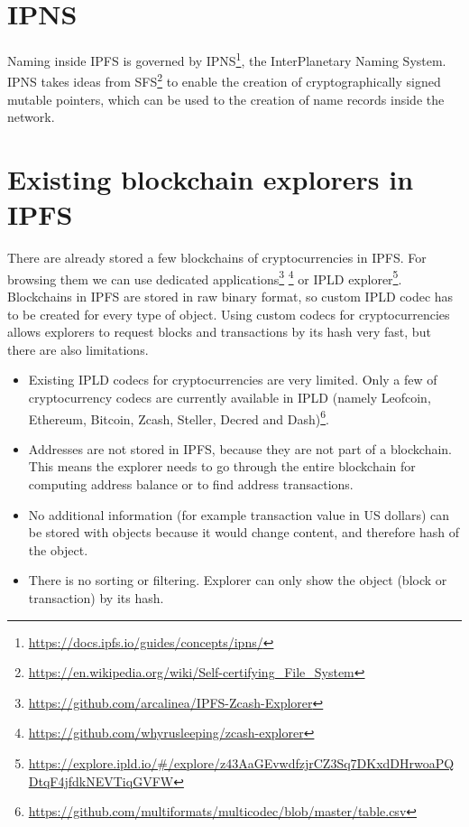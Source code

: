 \section{IPNS}
Naming inside IPFS is governed by IPNS\footnote{\url{https://docs.ipfs.io/guides/concepts/ipns/}}, the InterPlanetary Naming System. IPNS takes ideas from SFS\footnote{\url{https://en.wikipedia.org/wiki/Self-certifying_File_System}} to enable the creation of cryptographically signed mutable pointers, which can be used to the creation of name records inside the network.

\section{Existing blockchain explorers in IPFS}
There are already stored a few blockchains of cryptocurrencies in IPFS. For browsing them we can use dedicated applications\footnote{\url{https://github.com/arcalinea/IPFS-Zcash-Explorer}} \footnote{\url{https://github.com/whyrusleeping/zcash-explorer}} or IPLD explorer\footnote{\url{https://explore.ipld.io/\#/explore/z43AaGEvwdfzjrCZ3Sq7DKxdDHrwoaPQDtqF4jfdkNEVTiqGVFW}}. Blockchains in IPFS are stored in raw binary format, so custom IPLD codec has to be created for every type of object. Using custom codecs for cryptocurrencies allows explorers to request blocks and transactions by its hash very fast, but there are also limitations.

\begin{itemize}
    \item Existing IPLD codecs for cryptocurrencies are very limited. Only a few of cryptocurrency codecs are currently available in IPLD (namely Leofcoin, Ethereum, Bitcoin, Zcash, Steller, Decred and Dash)\footnote{\url{https://github.com/multiformats/multicodec/blob/master/table.csv}}.
    \item Addresses are not stored in IPFS, because they are not part of a blockchain. This means the explorer needs to go through the entire blockchain for computing address balance or to find address transactions.
    \item No additional information (for example transaction value in US dollars) can be stored with objects because it would change content, and therefore hash of the object.
    \item There is no sorting or filtering. Explorer can only show the object (block or transaction) by its hash. 
\end{itemize}




